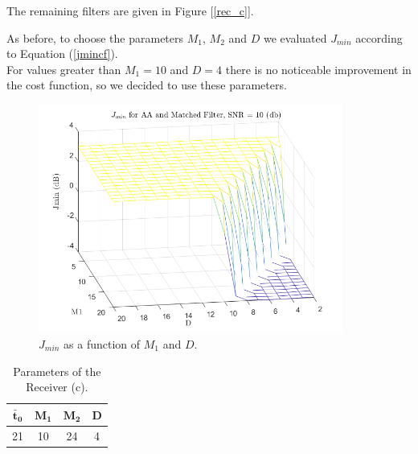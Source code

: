 \documentclass[a4paper, 12pt]{report}
\begin{document}
The remaining filters are given in Figure [\ref{rec_c}].

As before, to choose the parameters $M_1$, $M_2$ and $D$ we evaluated $J_{min}$ according to Equation (\ref{jmincf}).\\
For values greater than $M_1=10$ and $D=4$ there is no noticeable improvement in the cost function, so we decided to use these parameters.

\begin{figure}[H]
	\centering
	\includegraphics[width=10cm]{images/optimal_params_AntiAliasing}
	\caption{$J_{min}$ as a function of $M_1$ and $D$.}\label{j_min_aa}
\end{figure}

\begin{table}[H]
	\centering
	\begin{tabular}{c c c c}
		\toprule
		$\mathbf{\bar{t}_0}$ & $\mathbf{M_1}$ & $\mathbf{M_2}$ & \textbf{D}     \\
		\midrule
		21 & 10 & 24 & 4 \\
		\bottomrule			
	\end{tabular}
	\caption{Parameters of the Receiver (c).}
	\label{Tab_c}
\end{table}
\end{document}
